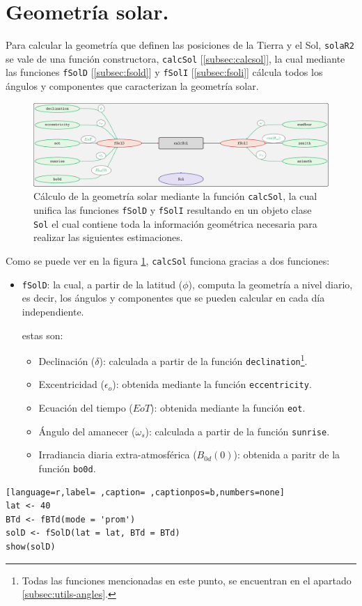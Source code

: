\section{Geometría solar.}
\label{sec:org814b888}
\label{sec:geometria-solar}
Para calcular la geometría que definen las posiciones de la Tierra y el Sol, \texttt{solaR2} se vale de una función constructora, \texttt{calcSol} [\ref{subsec:calcsol}], la cual mediante las funciones \texttt{fSolD} [\ref{subsec:fsold}] y \texttt{fSolI} [\ref{subsec:fsoli}] cálcula todos los ángulos y componentes que caracterizan la geometría solar.
\begin{figure}[]
\centering
\includegraphics[keepaspectratio,width=\textwidth,height=0.5\textheight]{figuras/calcSol.pdf}
\caption{Cálculo de la geometría solar mediante la función \texttt{calcSol}, la cual unifica las funciones \texttt{fSolD} y \texttt{fSolI} resultando en un objeto clase \texttt{Sol} el cual contiene toda la información geométrica necesaria para realizar las siguientes estimaciones. \label{fig:calcSol}}
\end{figure}
Como se puede ver en la figura \ref{fig:calcSol}, \texttt{calcSol} funciona gracias a dos funciones:
\begin{itemize}
\item \texttt{fSolD}: la cual, a partir de la latitud (\(\phi\)), computa la geometría a nivel diario, es decir, los ángulos y componentes que se pueden calcular en cada día independiente.

estas son:
\begin{itemize}
\item Declinación (\(\delta\)): calculada a partir de la función \texttt{declination}\footnote{Todas las funciones mencionadas en este punto, se encuentran en el apartado \ref{subsec:utils-angles}.}.
\item Excentricidad (\(\epsilon_o\)): obtenida mediante la función \texttt{eccentricity}.
\item Ecuación del tiempo (\(EoT\)): obtenida mediante la función \texttt{eot}.
\item Ángulo del amanecer (\(\omega_s\)): calculada a partir de la función \texttt{sunrise}.
\item Irradiancia diaria extra-atmosférica (\(B_{0d}(0)\)): obtenida a paritr de la función \texttt{bo0d}.
\end{itemize}
\end{itemize}
\begin{lstlisting}[language=r,label= ,caption= ,captionpos=b,numbers=none]
lat <- 40
BTd <- fBTd(mode = 'prom')
solD <- fSolD(lat = lat, BTd = BTd)
show(solD)
\end{lstlisting}

